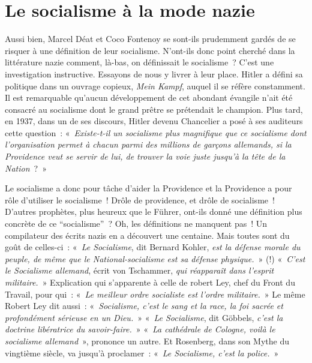 \documentclass[french,twoside]{book} %
\begin{document}
\section[{Le socialisme à la mode nazie}]{Le socialisme à la mode nazie}
\noindent Aussi bien, Marcel Déat et Coco Fontenoy se sont-ils prudemment gardés de se risquer à une définition de leur   socialisme. N’ont-ils donc point cherché dans la littérature nazie comment, là-bas, on définissait le socialisme ? C’est une investigation instructive. Essayons de nous y livrer à leur place. Hitler a défini sa politique dans un ouvrage copieux, \emph{Mein Kampf}, auquel il se réfère constamment. Il est remarquable qu’aucun développement de cet abondant évangile n’ait été consacré au socialisme dont le grand prêtre se prétendait le champion. Plus tard, en 1937, dans un de ses discours, Hitler devenu Chancelier a posé à ses auditeurs cette question : « \emph{Existe-t-il un socialisme plus magnifique que ce socialisme dont l’organisation permet à chacun parmi des millions de garçons allemands, si la Providence veut se servir de lui, de trouver la voie juste jusqu’à la tête de la Nation} ? »\par
Le socialisme a donc pour tâche d’aider la Providence et la Providence a pour rôle d’utiliser le socialisme ! Drôle de providence, et drôle de socialisme ! D’autres prophètes, plus heureux que le Führer, ont-ils donné une définition plus concrète de ce “socialisme” ? Oh, les définitions ne manquent pas ! Un compilateur des écrits nazis en a découvert une centaine. Mais toutes sont du goût de celles-ci : « \emph{Le Socialisme}, dit Bernard Kohler, \emph{est la défense morale du peuple, de même que le National-socialisme est sa défense physique.} » (!) « \emph{C’est le Socialisme allemand}, écrit von Tschammer, \emph{qui réapparaît dans l’esprit militaire.} » Explication qui s’apparente à celle de robert Ley, chef du Front du Travail, pour qui : « \emph{Le meilleur ordre socialiste est l’ordre militaire.} » Le même Robert Ley dit aussi : « \emph{Socialisme, c’est le sang et la race, la foi sacrée et profondément sérieuse en un Dieu.} » « \emph{Le Socialisme}, dit Göbbels, \emph{c’est la doctrine libératrice du savoir-faire.} » « \emph{La cathédrale de Cologne, voilà le socialisme allemand} », prononce un autre. Et Rosenberg, dans son Mythe du vingtième siècle, va jusqu’à proclamer : « \emph{Le Socialisme, c’est la police.} »\par
\end{document}
